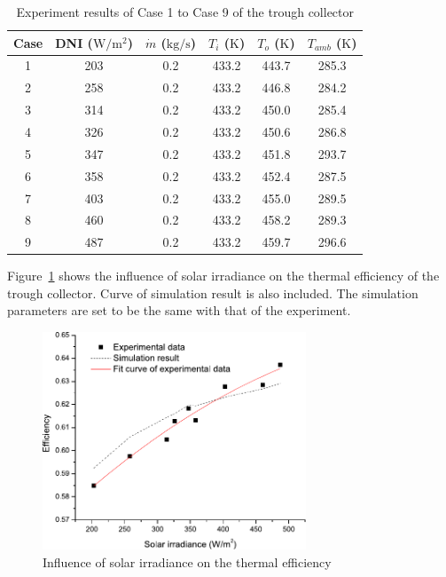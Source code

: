 \begin{table}[htbp]\footnotesize
	\caption{Experiment results of Case 1 to Case 9 of the trough collector}
	\begin{center}
	\begin{tabular}{cccccc}
		\toprule
		Case	& DNI ($\mathrm{W/m^2}$)	&	$\dot{m}$ ($\mathrm{kg/s}$)			&	$T_i$ ($\mathrm{K}$)	&	$T_o$ ($\mathrm{K}$)		&	$T_{amb}$ ($\mathrm{K}$)\\
		\midrule
		1	&	203	&	0.2	&	433.2	&	443.7	&	285.3\\
		2	&	258	&	0.2	&	433.2	&	446.8	&	284.2\\
		3	&	314	&	0.2	&	433.2	&	450.0	&	285.4	\\
		4	&	326	&	0.2	&	433.2	&	450.6	&	286.8\\
		5	&	347	&	0.2	&	433.2	&	451.8	&	293.7\\
		6	&	358	&	0.2	&	433.2	&	452.4	&	287.5\\
		7	&	403	&	0.2	&	433.2	&	455.0	&	289.5\\
		8	&	460	&	0.2	&	433.2	&	458.2	&	289.3\\
		9	&	487	&	0.2	&	433.2	&	459.7	&	296.6\\
		\bottomrule
	\end{tabular}
	\end{center}
	\label{tab:ResultOfTrough1}
\end{table}

Figure~\ref{fig:I_r-eta-trough} shows the influence of solar irradiance on the thermal efficiency of the trough collector. Curve of simulation result is also included. The simulation parameters are set to be the same with that of the experiment. 
\begin{figure}[!ht]
\centering
\includegraphics[width=0.7\textwidth]{fig/I_r-eta-trough}
\caption{Influence of solar irradiance on the thermal efficiency}
\label{fig:I_r-eta-trough}
\end{figure}

